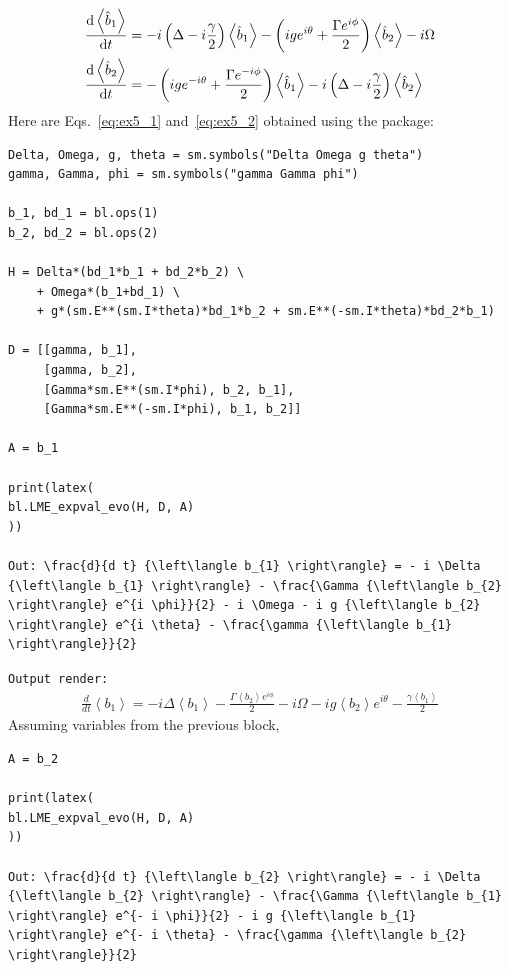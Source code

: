 \documentclass[5p, twocolumn, 10pt, sort&compress]{elsarticle}
\newcommand{\inlinecode}[1]{\texttt{#1}}
\newcommand{\expval}[1]{\left\langle{#1}\right\rangle}
\newcommand{\bop}{\hat{b}}
\newenvironment{revision2}{%
\color{red}
}
{}
\begin{document}
\begin{subequations}
\begin{align}
        \odv{\expval{\bop_1}}{t} &=
    -i\left(\Delta -i \frac{\gamma}{2}\right)\expval{\bop_1}-\left(ige^{i\theta}+\frac{\Gamma e^{i\phi}}{2}\right)\expval{\bop_2}-i\Omega \label{eq:ex5_1}
    \\
    \odv{\expval{\bop_2}}{t} &=
    -\left(ige^{-i\theta}+\frac{\Gamma e^{-i\phi}}{2}\right)\expval{\bop_1}-i\left(\Delta-i\frac{\gamma}{2}\right)\expval{\bop_2}\label{eq:ex5_2}
\end{align}
\end{subequations}
Here are Eqs.~\eqref{eq:ex5_1} and~\eqref{eq:ex5_2} obtained using the package:
\begin{verbatim}
Delta, Omega, g, theta = sm.symbols("Delta Omega g theta")
gamma, Gamma, phi = sm.symbols("gamma Gamma phi")

b_1, bd_1 = bl.ops(1)
b_2, bd_2 = bl.ops(2)

H = Delta*(bd_1*b_1 + bd_2*b_2) \
    + Omega*(b_1+bd_1) \
    + g*(sm.E**(sm.I*theta)*bd_1*b_2 + sm.E**(-sm.I*theta)*bd_2*b_1)

D = [[gamma, b_1],
     [gamma, b_2],
     [Gamma*sm.E**(sm.I*phi), b_2, b_1],
     [Gamma*sm.E**(-sm.I*phi), b_1, b_2]]

A = b_1

print(latex(
bl.LME_expval_evo(H, D, A)
))

Out: \frac{d}{d t} {\left\langle b_{1} \right\rangle} = - i \Delta {\left\langle b_{1} \right\rangle} - \frac{\Gamma {\left\langle b_{2} \right\rangle} e^{i \phi}}{2} - i \Omega - i g {\left\langle b_{2} \right\rangle} e^{i \theta} - \frac{\gamma {\left\langle b_{1} \right\rangle}}{2}
\end{verbatim}
\begin{revision2}
\noindent\inlinecode{Output render:}
\begin{align*}
\frac{d}{d t} {\left\langle b_{1} \right\rangle} = - i \Delta {\left\langle b_{1} \right\rangle} - \frac{\Gamma {\left\langle b_{2} \right\rangle} e^{i \phi}}{2} - i \Omega - i g {\left\langle b_{2} \right\rangle} e^{i \theta} - \frac{\gamma {\left\langle b_{1} \right\rangle}}{2}
\end{align*}
\end{revision2}
\newpage
\noindent Assuming variables from the previous block,
\begin{verbatim}
A = b_2

print(latex(
bl.LME_expval_evo(H, D, A)
))

Out: \frac{d}{d t} {\left\langle b_{2} \right\rangle} = - i \Delta {\left\langle b_{2} \right\rangle} - \frac{\Gamma {\left\langle b_{1} \right\rangle} e^{- i \phi}}{2} - i g {\left\langle b_{1} \right\rangle} e^{- i \theta} - \frac{\gamma {\left\langle b_{2} \right\rangle}}{2}
\end{verbatim}
\end{document}
